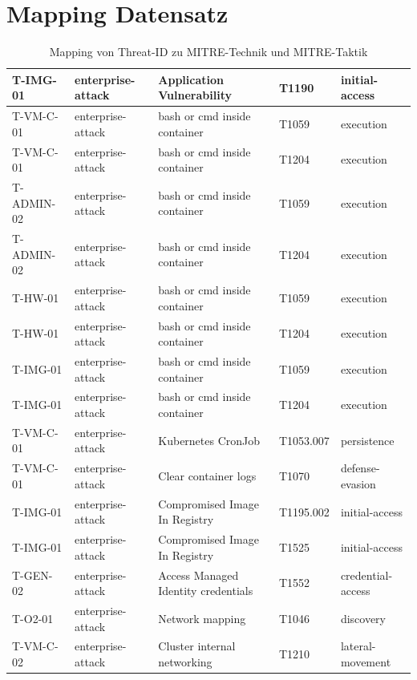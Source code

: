 \chapter{Mapping Datensatz}
\label{app:mapping-dataset}
\begin{longtable}{|l|l|l|l|l|}
    \caption{Mapping von Threat-ID zu MITRE-Technik und MITRE-Taktik}\\
    \hline
    T-IMG-01 & enterprise-attack & Application Vulnerability & T1190 & initial-access \\ \hline
    T-VM-C-01 & enterprise-attack & bash or cmd inside container & T1059 & execution \\ \hline
    T-VM-C-01 & enterprise-attack & bash or cmd inside container & T1204 & execution \\ \hline
    T-ADMIN-02 & enterprise-attack & bash or cmd inside container & T1059 & execution \\ \hline
    T-ADMIN-02 & enterprise-attack & bash or cmd inside container & T1204 & execution \\ \hline
    T-HW-01 & enterprise-attack & bash or cmd inside container & T1059 & execution \\ \hline
    T-HW-01 & enterprise-attack & bash or cmd inside container & T1204 & execution \\ \hline
    T-IMG-01 & enterprise-attack & bash or cmd inside container & T1059 & execution \\ \hline
    T-IMG-01 & enterprise-attack & bash or cmd inside container & T1204 & execution \\ \hline
    T-VM-C-01 & enterprise-attack & Kubernetes CronJob & T1053.007 & persistence \\ \hline
    T-VM-C-01 & enterprise-attack & Clear container logs & T1070 & defense-evasion \\ \hline
    T-IMG-01 & enterprise-attack & Compromised Image In Registry & T1195.002 & initial-access \\ \hline
    T-IMG-01 & enterprise-attack & Compromised Image In Registry & T1525 & initial-access \\ \hline
    T-GEN-02 & enterprise-attack & Access Managed Identity credentials & T1552 & credential-access \\ \hline
    T-O2-01 & enterprise-attack & Network mapping & T1046 & discovery \\ \hline
    T-VM-C-02 & enterprise-attack & Cluster internal networking & T1210 & lateral-movement \\ \hline

\end{longtable}
